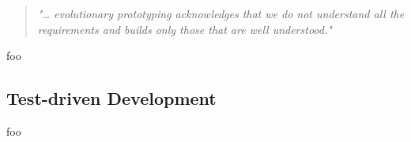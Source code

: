 
\begin{quote}
	\textit{"… evolutionary prototyping acknowledges that we do not understand all the requirements and builds only those that are well understood."} \cite{operational_prototyping}
\end{quote}



foo


\subsection{Test-driven Development}

foo
